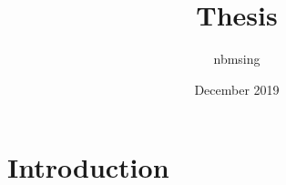 \documentclass{article}
\title{Thesis}
\author{nbmsing }
\date{December 2019}
\begin{document}
\maketitle

\section{Introduction}
\end{document}
